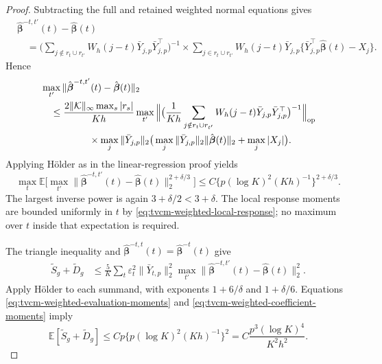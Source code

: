 \documentclass[12pt]{article}
\def\E{\mathbb{E}}
\numberwithin{equation}{section}
\begin{document}
\begin{proof}
Subtracting the full and retained weighted normal equations
gives
\begin{align*}
&\hat{\boldsymbol\beta}^{-t,t'}(t)
-\hat{\boldsymbol\beta}(t)\\
&\quad=
\big(
\sum_{j\notin r_t\cup r_{t'}}
W_h(j-t)\bar Y_{j,p}\bar Y_{j,p}^\top
\big)^{-1}\times
\sum_{j\in r_t\cup r_{t'}}
W_h(j-t)\bar Y_{j,p}
\{\bar Y_{j,p}^\top\hat{\boldsymbol\beta}(t)-X_j\}.
\end{align*}
Hence
\begin{align}
&\max_{t'}
\|\hat{\boldsymbol\beta}^{-t,t'}(t)
-\hat{\boldsymbol\beta}(t)\|_2
\notag\\
&\quad\leq
\frac{2\|\mathcal K\|_\infty\max_s|r_s|}{Kh}
\max_{t'}
\Big\|
\big(
\frac1{Kh}
\sum_{j\notin r_t\cup r_{t'}}
W_h(j-t)\bar Y_{j,p}\bar Y_{j,p}^\top
\big)^{-1}
\Big\|_{\mathrm{op}}
\notag\\
&\quad\quad\quad\quad\quad\times
\max_j\|\bar Y_{j,p}\|_2
\big(
\max_j\|\bar Y_{j,p}\|_2
\|\hat{\boldsymbol\beta}(t)\|_2
+\max_j|X_j|
\big).
\label{eq:tvcm-weighted-coefficient-bound}
\end{align}
Applying H\"older as in the linear-regression proof yields
\begin{equation}
\label{eq:tvcm-weighted-coefficient-moments}
\max_t
\E\big[
\max_{t'}
\|\hat{\boldsymbol\beta}^{-t,t'}(t)
-\hat{\boldsymbol\beta}(t)\|_2^{2+\delta/3}
\big]
\leq
C\big\{
p(\log K)^2(Kh)^{-1}
\big\}^{2+\delta/3}.
\end{equation}
The largest inverse power is again
$3+\delta/2<3+\delta$.
The local response moments are bounded uniformly in $t$ by
\eqref{eq:tvcm-weighted-local-response}; no maximum over $t$
inside that expectation is required.

The triangle inequality and
$\hat{\boldsymbol\beta}^{-t,t}(t)
=\hat{\boldsymbol\beta}^{-t}(t)$ give
\begin{align*}
\tilde S_g+\tilde D_g
&\leq
\frac5K\sum_t
\varepsilon_t^2\|\bar Y_{t,p}\|_2^2
\max_{t'}
\|\hat{\boldsymbol\beta}^{-t,t'}(t)
-\hat{\boldsymbol\beta}(t)\|_2^2.
\end{align*}
Apply H\"older to each summand, with exponents
$1+6/\delta$ and $1+\delta/6$.
Equations
\eqref{eq:tvcm-weighted-evaluation-moments} and
\eqref{eq:tvcm-weighted-coefficient-moments} imply
\[
\E[\tilde S_g+\tilde D_g]
\leq
Cp\big\{
p(\log K)^2(Kh)^{-1}
\big\}^2
=
C\frac{p^3(\log K)^4}{K^2h^2}.
\]


\end{proof}
\end{document}
